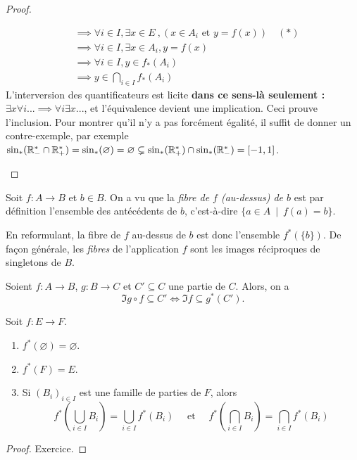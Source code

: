 \begin{proof}
\begin{enumerate}
\begin{align*}
&\boxed{\implies \forall i\in I, \exists x\in E}\:, (x\in A_i\text{ et } y=f(x)) \quad(*)\\
&\implies \forall i\in I, \exists x\in A_i, y=f(x)\\
&\implies \forall i\in I, y\in f_*(A_i)\\
&\implies y\in \bigcap_{i\in I} f_*(A_i)
\end{align*}
L'interversion des quantificateurs  est licite \textbf{dans ce sens-là seulement : $\exists x \forall i ... \implies \forall i \exists x ...$}, et l'équivalence devient une implication. Ceci prouve l'inclusion. Pour montrer qu'il n'y a pas forcément égalité, il suffit de donner un contre-exemple, par exemple $\sin_*(\mathbb{R}_-^* \cap \mathbb{R}_+^*) = \sin_*(\varnothing) = \varnothing \subsetneq \sin_*(\mathbb{R}_+^*) \cap \sin_*(\mathbb{R}_-^*)=[-1,1]$.
\end{enumerate}
\end{proof}



\begin{exemple}
Soit $f : A\to B$ et $b\in B$. On a vu que la \emph{fibre de $f$ (au-dessus) de $b$} est par définition l'ensemble des antécédents de $b$, c'est-à-dire $\{a\in A \:\mid\: f(a)=b\} $.

En reformulant, la fibre de $f$ au-dessus de $b$ est donc l'ensemble $f^*(\{b\})$. De façon générale, les \emph{fibres} de l'application $f$ sont les images réciproques de singletons de $B$.
\end{exemple}

\begin{exemple}
Soient $f : A\to B$,  $g : B\to C$ et $C'\subseteq C$ une partie de $C$. Alors, on a 
\[\Im g\circ f \subseteq C' \iff \Im f \subseteq g^*(C').\]
\end{exemple}

\begin{proposition}
Soit $f : E\to F$.
\begin{enumerate}
\item $f^*(\varnothing)=\varnothing$.
\item $f^*(F)=E$.
\item Si $(B_i)_{i\in I}$ est une famille de parties de $F$, alors 
\[
f^*\left(\bigcup_{i\in I}B_i\right) 
= \bigcup_{i\in I} f^*(B_i)
\quad \text{ et } \quad 
f^*\left(\bigcap_{i\in I}B_i\right) 
= \bigcap_{i\in I} f^*(B_i)
\]
\end{enumerate}
\end{proposition}
\begin{proof} Exercice.
\end{proof}

